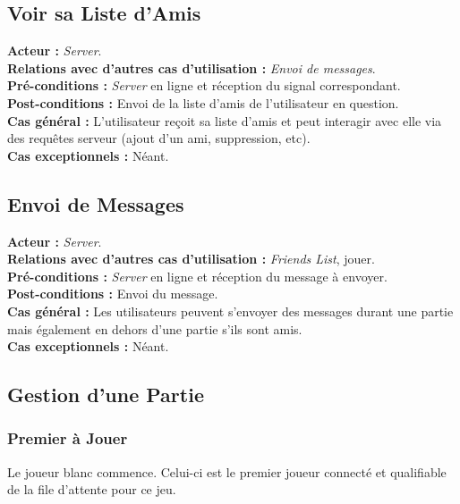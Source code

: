 \documentclass[10pt, a4paper]{article}
\begin{document}
\subsection{Voir sa Liste d'Amis}
\textbf{Acteur :} \textit{Server}. \\
\textbf{Relations avec d'autres cas d'utilisation :} {\itshape Envoi de messages}. \\
\textbf{Pré-conditions :} \textit{Server} en ligne et réception du signal correspondant. \\
\textbf{Post-conditions :} Envoi de la liste d'amis de l'utilisateur en question. \\
\textbf{Cas général :} L'utilisateur reçoit sa liste d'amis et peut interagir avec elle via des requêtes serveur (ajout d'un ami, suppression, etc).\\
\textbf{Cas exceptionnels :} Néant. \\

\subsection{Envoi de Messages}
\textbf{Acteur :} \textit{Server}. \\
\textbf{Relations avec d'autres cas d'utilisation :} \textit{Friends List}, jouer. \\
\textbf{Pré-conditions :} \textit{Server} en ligne et réception du message à envoyer. \\
\textbf{Post-conditions :} Envoi du message. \\
\textbf{Cas général :} Les utilisateurs peuvent s'envoyer des messages durant une partie mais également en dehors d'une partie s'ils sont amis. \\
\textbf{Cas exceptionnels :} Néant. \\

\subsection{Gestion d'une Partie}

\subsubsection{Premier à Jouer}
Le joueur blanc commence. Celui-ci est le premier joueur connecté et qualifiable de la file d'attente pour ce jeu. \\
\end{document}
